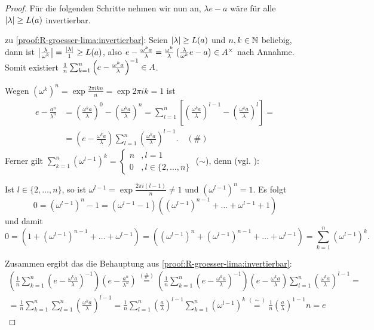 \begin{proof}
Für die folgenden Schritte nehmen wir nun an, $\lambda e - a$ wäre für alle $|\lambda| \geq L(a)$ invertierbar.

zu \ref{proof:R-groesser-lima:invertierbar}:
Seien $|\lambda| \geq L(a)$ und $n,k \in \mathbb{N}$ beliebig, dann ist $\left|\frac{\lambda}{\omega^k}\right| = \frac{|\lambda|}{1} \geq L(a)$, also $e-\frac{\omega^k a}{\lambda} = \frac{\omega^k}{\lambda} \left(\frac{\lambda}{\omega^k}e - a\right) \in A^\times$ nach Annahme. Somit existiert $\frac{1}{n}\sum_{k=1}^n \left(e-\frac{\omega^k a}{\lambda}\right)^{-1} \in A$.

Wegen $\left(\omega^{k}\right)^n = \exp{\frac{2\pi i kn}{n}} = \exp{2\pi i k} = 1$ ist
\begin{align*}
	e - \frac{a^n}{\lambda^n} &= \left(\frac{\omega^k a}{\lambda}\right)^0 - \left(\frac{\omega^k a}{\lambda}\right)^n = \sum_{l=1}^n \left[\left(\frac{\omega^k a}{\lambda}\right)^{l-1} - \left(\frac{\omega^k a}{\lambda}\right)^l\right] = \\
		&=\left(e - \frac{\omega^k a}{\lambda}\right)\sum_{l=1}^n \left(\frac{\omega^k a}{\lambda}\right)^{l-1}. \quad (\#)
\end{align*}
Ferner gilt $\sum_{k=1}^n \left(\omega^{l-1}\right)^k = \begin{cases}n &,l=1 \\ 0 &,l\in\{2, \dots, n\}\end{cases}$ ($\sim$), denn (vgl. \cite[S. 10-8,10-9]{Einheitswurzeln}):

Ist $l\in\{2, \dots, n\}$, so ist $\omega^{l-1} = \exp{\frac{2\pi i(l-1)}{n}} \neq 1$ und $\left(\omega^{l-1}\right)^n = 1$. Es folgt
	\[0 = \left(\omega^{l-1}\right)^n - 1 = \left(\omega^{l-1} - 1\right)\left(\left(\omega^{l-1}\right)^{n-1} + \dots + \omega^{l-1} + 1\right)\]
und damit
	\[0 = \left(1 + \left(\omega^{l-1}\right)^{n-1} + \dots + \omega^{l-1}\right) = \left(\left(\omega^{l-1}\right)^{n} + \left(\omega^{l-1}\right)^{n-1} + \dots + \omega^{l-1}\right) = \sum_{k=1}^n \left(\omega^{l-1}\right)^k.\]

Zusammen ergibt das die Behauptung aus \ref{proof:R-groesser-lima:invertierbar}:
\begin{align*}
	\left(\frac{1}{n}\sum_{k=1}^n \left(e-\frac{\omega^k a}{\lambda}\right)^{-1}\right) \left(e - \frac{a^n}{\lambda^n}\right) \overset{(\#)}{=} \left(\frac{1}{n}\sum_{k=1}^n \left(e-\frac{\omega^k a}{\lambda}\right)^{-1}\right) \left(e - \frac{\omega^k a}{\lambda}\right)\sum_{l=1}^n \left(\frac{\omega^k a}{\lambda}\right)^{l-1} = \\
	= \frac{1}{n}\sum_{k=1}^n \sum_{l=1}^n \left(\frac{\omega^k a}{\lambda}\right)^{l-1} = \frac{1}{n} \sum_{l=1}^n \left(\frac{a}{\lambda}\right)^{l-1} \sum_{k=1}^n \left(\omega^{l-1}\right)^k \overset{(\sim)}{=} \frac{1}{n} \left(\frac{a}{\lambda}\right)^{1-1}n = e
\end{align*}


\end{proof}
